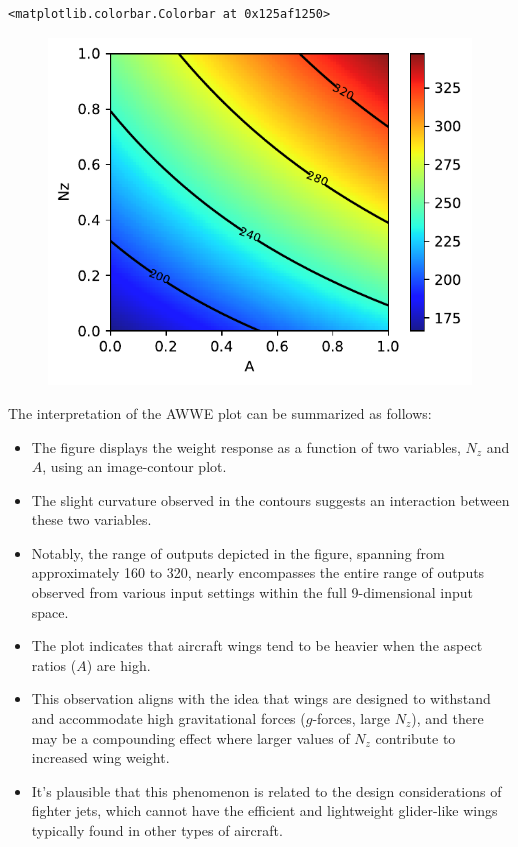 \documentclass[
  letterpaper,
  DIV=11,
  numbers=noendperiod]{scrreprt}
\providecommand{\tightlist}{%
  \setlength{\itemsep}{0pt}\setlength{\parskip}{0pt}}\usepackage{longtable,booktabs,array}
\begin{document}
\begin{verbatim}
<matplotlib.colorbar.Colorbar at 0x125af1250>
\end{verbatim}

\begin{figure}[H]

{\centering \includegraphics{002_awwe_files/figure-pdf/cell-6-output-2.pdf}

}

\end{figure}

The interpretation of the AWWE plot can be summarized as follows:

\begin{itemize}
\tightlist
\item
  The figure displays the weight response as a function of two
  variables, \(N_z\) and \(A\), using an image-contour plot.
\item
  The slight curvature observed in the contours suggests an interaction
  between these two variables.
\item
  Notably, the range of outputs depicted in the figure, spanning from
  approximately 160 to 320, nearly encompasses the entire range of
  outputs observed from various input settings within the full
  9-dimensional input space.
\item
  The plot indicates that aircraft wings tend to be heavier when the
  aspect ratios (\(A\)) are high.
\item
  This observation aligns with the idea that wings are designed to
  withstand and accommodate high gravitational forces (\(g\)-forces,
  large \(N_z\)), and there may be a compounding effect where larger
  values of \(N_z\) contribute to increased wing weight.
\item
  It's plausible that this phenomenon is related to the design
  considerations of fighter jets, which cannot have the efficient and
  lightweight glider-like wings typically found in other types of
  aircraft.
\end{itemize}
\end{document}
